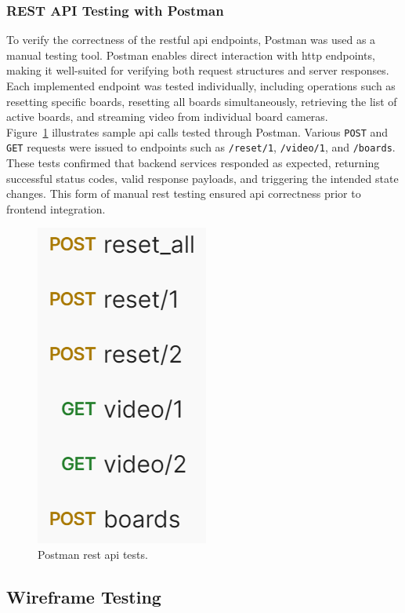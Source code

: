 \subsubsection*{REST API Testing with Postman}
\label{subsubsec:rest-api-methods}

To verify the correctness of the \gls{rest}ful \gls{api} endpoints, Postman was used as a manual testing tool. Postman enables direct interaction with \gls{http} endpoints, making it well-suited for verifying both request structures and server responses. Each implemented endpoint was tested individually, including operations such as resetting specific boards, resetting all boards simultaneously, retrieving the list of active boards, and streaming video from individual board cameras. \\

Figure~\ref{fig:postman-rest-tests} illustrates sample \gls{api} calls tested through Postman. Various \texttt{POST} and \texttt{GET} requests were issued to endpoints such as \texttt{/reset/1}, \texttt{/video/1}, and \texttt{/boards}. These tests confirmed that backend services responded as expected, returning successful status codes, valid response payloads, and triggering the intended state changes. This form of manual \gls{rest} testing ensured \gls{api} correctness prior to frontend integration.

\begin{figure}[h!]
    \centering
    \includegraphics[width=0.25\linewidth]{figures//methods/postman-light.png}
    \caption[Postman REST API tests]{Postman \gls{rest} \gls{api} tests.}
    \label{fig:postman-rest-tests}
\end{figure}

\subsection{Wireframe Testing}
\label{subsubsec:user-centered-design}

